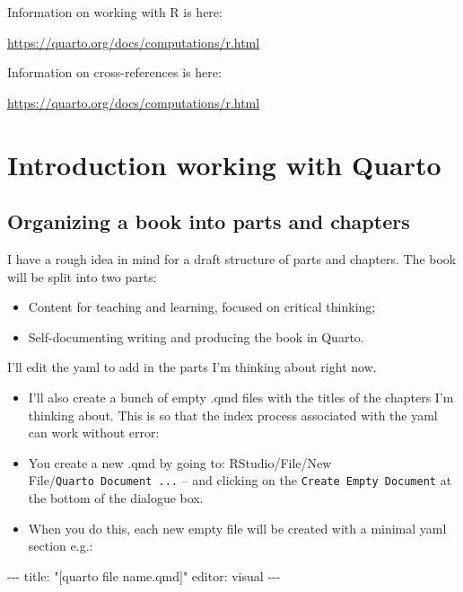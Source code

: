 \documentclass[
  letterpaper,
  DIV=11,
  numbers=noendperiod]{scrreprt}
\newenvironment{Shaded}{\begin{snugshade}}{\end{snugshade}}
\newcommand{\NormalTok}[1]{\textcolor[rgb]{0.00,0.23,0.31}{#1}}
\newcommand{\SpecialCharTok}[1]{\textcolor[rgb]{0.37,0.37,0.37}{#1}}
\newcommand{\StringTok}[1]{\textcolor[rgb]{0.13,0.47,0.30}{#1}}
\providecommand{\tightlist}{%
  \setlength{\itemsep}{0pt}\setlength{\parskip}{0pt}}
\begin{document}
Information on working with R is here:

\url{https://quarto.org/docs/computations/r.html}

Information on cross-references is here:

\url{https://quarto.org/docs/computations/r.html}


\chapter{Introduction working with
Quarto}\label{introduction-working-with-quarto}

\section{Organizing a book into parts and
chapters}\label{organizing-a-book-into-parts-and-chapters}

I have a rough idea in mind for a draft structure of parts and chapters.
The book will be split into two parts:

\begin{itemize}
\tightlist
\item
  Content for teaching and learning, focused on critical thinking;
\item
  Self-documenting writing and producing the book in Quarto.
\end{itemize}

I'll edit the yaml to add in the parts I'm thinking about right now.

\begin{itemize}
\tightlist
\item
  I'll also create a bunch of empty .qmd files with the titles of the
  chapters I'm thinking about. This is so that the index process
  associated with the yaml can work without error:
\item
  You create a new .qmd by going to: RStudio/File/New
  File/\texttt{Quarto\ Document\ ...} -- and clicking on the
  \texttt{Create\ Empty\ Document} at the bottom of the dialogue box.
\item
  When you do this, each new empty file will be created with a minimal
  yaml section e.g.:
\end{itemize}

\begin{Shaded}
\begin{Highlighting}[]
\SpecialCharTok{{-}{-}{-}}
\NormalTok{title}\SpecialCharTok{:} \StringTok{"[quarto file name.qmd]"}
\NormalTok{editor}\SpecialCharTok{:}\NormalTok{ visual}
\SpecialCharTok{{-}{-}{-}}
\end{Highlighting}
\end{Shaded}
\end{document}
